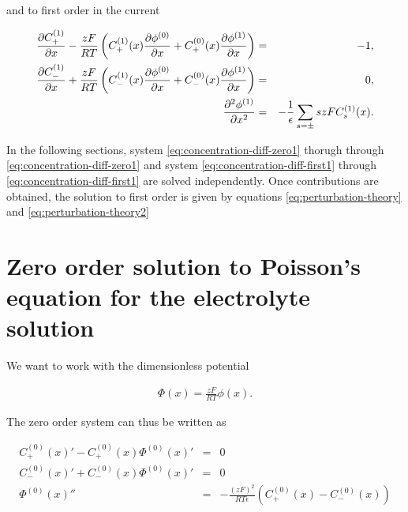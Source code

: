 and to first order in the current

\begin{eqnarray}
\label{eq:first-order-system}
\frac{\partial C^{(1)}_+}{\partial x}-\frac{zF}{RT}\left({C^{(1)}_+(x)\frac{\partial \phi^{(0)}}{\partial x}+C^{(0)}_+(x)\frac{\partial \phi^{(1)}}{\partial x}}\right) &=& -1,\\
\label{eq:concentration-diff-first1}
\frac{\partial C^{(1)}_-}{\partial x}+\frac{zF}{RT}\left({C^{(1)}_-(x)\frac{\partial \phi^{(0)}}{\partial x}+C^{(0)}_-(x)\frac{\partial \phi^{(1)}}{\partial x}}\right)&=& 0,\\
\label{eq:concentration-diff-first2}
\frac{\partial^2  \phi^{(1)}}{\partial x^2} &=& -\frac{1}{\epsilon}\sum_{s= \pm} szF C^{(1)}_{s}(x).
\label{eq:concentration-diff-first3}
\end{eqnarray}


In the following sections, system \ref{eq:concentration-diff-zero1} thorugh through \ref{eq:concentration-diff-zero1} and system \ref{eq:concentration-diff-first1} through \ref{eq:concentration-diff-first1} are solved independently. Once contributions are obtained, the solution to first order is given by equations \ref{eq:perturbation-theory} and \ref{eq:perturbation-theory2}





\newpage

\section{Zero order solution to Poisson's equation for the electrolyte solution}
\label{sec:zeroorderphi}

We want to work with the dimensionless potential 

\begin{align}
	\label{eq:dimensionless-potential}
	\Phi(x) = \frac{zF}{RT}\phi(x).
\end{align}

The zero order system can thus be written as

\begin{eqnarray}
\label{eq:zero-order}
C^{(0)}_+(x)'-C^{(0)}_+(x)\Phi^{(0)}(x)' &=& 0\\
 C^{(0)}_-(x)'+C^{(0)}_-(x)\Phi^{(0)}(x)'&=& 0\\
\Phi^{(0)}(x) ''&=& -\frac{(zF)^2}{RT\epsilon} (C^{(0)}_{+}(x)-C^{(0)}_{-}(x))
\end{eqnarray}



